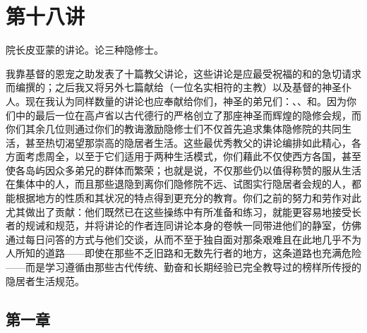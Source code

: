 

\section{第十八讲}

\par

院长皮亚蒙的讲论。论三种隐修士。\par

我靠基督的恩宠之助发表了十篇教父讲论，这些讲论是应最受祝福的和的急切请求而编撰的；之后我又将另外七篇献给（一位名实相符的主教）以及基督的神圣仆人。现在我认为同样数量的讲论也应奉献给你们，神圣的弟兄们：、、和。因为你们中的最后一位在高卢省以古代德行的严格创立了那座神圣而辉煌的隐修会规，而你们其余几位则通过你们的教诲激励隐修士们不仅首先追求集体隐修院的共同生活，甚至热切渴望那崇高的隐居者生活。这些最优秀教父的讲论编排如此精心，各方面考虑周全，以至于它们适用于两种生活模式，你们藉此不仅使西方各国，甚至使各岛屿因众多弟兄的群体而繁荣；也就是说，不仅那些仍以值得称赞的服从生活在集体中的人，而且那些退隐到离你们隐修院不远、试图实行隐居者会规的人，都能根据地方的性质和其状况的特点得到更充分的教育。你们之前的努力和劳作对此尤其做出了贡献：他们既然已在这些操练中有所准备和练习，就能更容易地接受长者的规诫和规范，并将讲论的作者连同讲论本身的卷帙一同带进他们的静室，仿佛通过每日问答的方式与他们交谈，从而不至于独自面对那条艰难且在此地几乎不为人所知的道路——即使在那些不乏旧路和无数先行者的地方，这条道路也充满危险——而是学习遵循由那些古代传统、勤奋和长期经验已完全教导过的榜样所传授的隐居者生活规范。\par


\subsection{第一章}

\par


